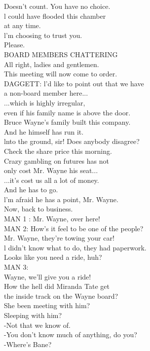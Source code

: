 \documentclass{article}
\begin{document}
\begin{multicols}{3}
Doesn't count. You have no choice.\\
l could have flooded this chamber\\
at any time.\\
l'm choosing to trust you.\\
Please.\\
BOARD MEMBERS CHATTERING\\
All right, ladies and gentlemen.\\
This meeting will now come to order.\\
DAGGETT: l'd like to point out that we have\\
a non-board member here...\\
...which is highly irregular,\\
even if his family name is above the door.\\
Bruce Wayne's family built this company.\\
And he himself has run it.\\
lnto the ground, sir! Does anybody disagree?\\
Check the share price this morning.\\
Crazy gambling on futures has not\\
only cost Mr. Wayne his seat...\\
...it's cost us all a lot of money.\\
And he has to go.\\
l'm afraid he has a point, Mr. Wayne.\\
Now, back to business.\\
MAN 1 : Mr. Wayne, over here!\\
MAN 2: How's it feel to be one of the people?\\
Mr. Wayne, they're towing your car!\\
l didn't know what to do, they had paperwork.\\
Looks like you need a ride, huh?\\
MAN 3:\\
Wayne, we'll give you a ride!\\
How the hell did Miranda Tate get\\
the inside track on the Wayne board?\\
She been meeting with him?\\
Sleeping with him?\\
-Not that we know of.\\
-You don't know much of anything, do you?\\
-Where's Bane?\\

\end{multicols}
\end{document}

